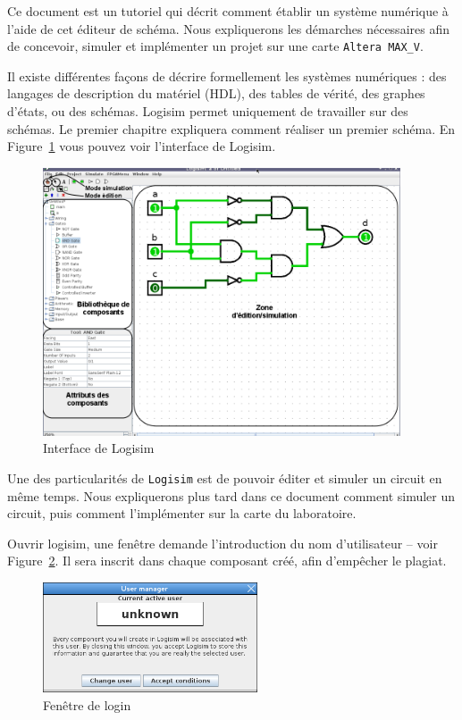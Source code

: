 \documentclass[nosolution]{exercice}
\begin{document}
Ce document est un
tutoriel qui décrit comment établir un système numérique à l'aide de cet éditeur de schéma. Nous expliquerons les
démarches nécessaires afin de concevoir, simuler et implémenter un projet sur une carte \texttt{Altera MAX\_V}.

Il existe différentes façons de décrire formellement les systèmes numériques : des langages de description du matériel
(HDL), des tables de vérité, des graphes d'états, ou des schémas. Logisim permet uniquement de travailler sur des
schémas. Le premier chapitre expliquera comment réaliser un premier schéma.
En Figure~\ref{fig_logisim_description} vous pouvez voir l'interface de Logisim.

\begin{figure}[H]
\begin{center}
\includegraphics[width=300pt]{images/Logisim_description.png}
\caption{\label{fig_logisim_description}Interface de Logisim}
\end{center}
\end{figure}

Une des particularités de \texttt{Logisim} est de pouvoir éditer et simuler un circuit en même temps.
Nous expliquerons plus tard dans ce document comment simuler un circuit, puis comment l'implémenter sur la carte du
laboratoire.

Ouvrir logisim, une fenêtre demande l'introduction du nom d'utilisateur -- voir Figure~\ref{fig_logisim_login}.
Il sera inscrit dans chaque composant créé, afin d'empêcher le plagiat.

\begin{figure}[H]
\begin{center}
\includegraphics[width=180pt]{images/login.png}
\caption{\label{fig_logisim_login}Fenêtre de login}
\end{center}
\end{figure}
\end{document}
